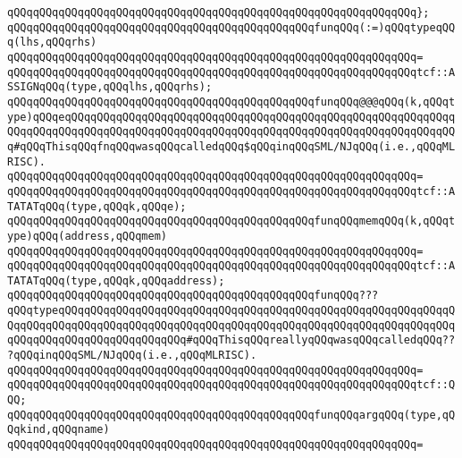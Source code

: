 \verb|qQQqqQQqqQQqqQQqqQQqqQQqqQQqqQQqqQQqqQQqqQQqqQQqqQQqqQQqqQQqqQQq};|\newline
\newline
\verb|qQQqqQQqqQQqqQQqqQQqqQQqqQQqqQQqqQQqqQQqqQQqqQQqfunqQQq(:=)qQQqtypeqQQq(lhs,qQQqrhs)|\newline
\verb|qQQqqQQqqQQqqQQqqQQqqQQqqQQqqQQqqQQqqQQqqQQqqQQqqQQqqQQqqQQqqQQq=|\newline
\verb|qQQqqQQqqQQqqQQqqQQqqQQqqQQqqQQqqQQqqQQqqQQqqQQqqQQqqQQqqQQqqQQqtcf::ASSIGNqQQq(type,qQQqlhs,qQQqrhs);|\newline
\newline
\verb|qQQqqQQqqQQqqQQqqQQqqQQqqQQqqQQqqQQqqQQqqQQqqQQqfunqQQq@@@qQQq(k,qQQqtype)qQQqeqQQqqQQqqQQqqQQqqQQqqQQqqQQqqQQqqQQqqQQqqQQqqQQqqQQqqQQqqQQqqQQqqQQqqQQqqQQqqQQqqQQqqQQqqQQqqQQqqQQqqQQqqQQqqQQqqQQqqQQqqQQqqQQqqQQq#qQQqThisqQQqfnqQQqwasqQQqcalledqQQq$qQQqinqQQqSML/NJqQQq(i.e.,qQQqMLRISC).|\newline
\verb|qQQqqQQqqQQqqQQqqQQqqQQqqQQqqQQqqQQqqQQqqQQqqQQqqQQqqQQqqQQqqQQq=|\newline
\verb|qQQqqQQqqQQqqQQqqQQqqQQqqQQqqQQqqQQqqQQqqQQqqQQqqQQqqQQqqQQqqQQqtcf::ATATATqQQq(type,qQQqk,qQQqe);|\newline
\newline
\verb|qQQqqQQqqQQqqQQqqQQqqQQqqQQqqQQqqQQqqQQqqQQqqQQqfunqQQqmemqQQq(k,qQQqtype)qQQq(address,qQQqmem)|\newline
\verb|qQQqqQQqqQQqqQQqqQQqqQQqqQQqqQQqqQQqqQQqqQQqqQQqqQQqqQQqqQQqqQQq=|\newline
\verb|qQQqqQQqqQQqqQQqqQQqqQQqqQQqqQQqqQQqqQQqqQQqqQQqqQQqqQQqqQQqqQQqtcf::ATATATqQQq(type,qQQqk,qQQqaddress);|\newline
\newline
\verb|qQQqqQQqqQQqqQQqqQQqqQQqqQQqqQQqqQQqqQQqqQQqqQQqfunqQQq???qQQqtypeqQQqqQQqqQQqqQQqqQQqqQQqqQQqqQQqqQQqqQQqqQQqqQQqqQQqqQQqqQQqqQQqqQQqqQQqqQQqqQQqqQQqqQQqqQQqqQQqqQQqqQQqqQQqqQQqqQQqqQQqqQQqqQQqqQQqqQQqqQQqqQQqqQQqqQQqqQQqqQQq#qQQqThisqQQqreallyqQQqwasqQQqcalledqQQq???qQQqinqQQqSML/NJqQQq(i.e.,qQQqMLRISC).|\newline
\verb|qQQqqQQqqQQqqQQqqQQqqQQqqQQqqQQqqQQqqQQqqQQqqQQqqQQqqQQqqQQqqQQq=|\newline
\verb|qQQqqQQqqQQqqQQqqQQqqQQqqQQqqQQqqQQqqQQqqQQqqQQqqQQqqQQqqQQqqQQqtcf::QQQ;|\newline
\newline
\verb|qQQqqQQqqQQqqQQqqQQqqQQqqQQqqQQqqQQqqQQqqQQqqQQqfunqQQqargqQQq(type,qQQqkind,qQQqname)|\newline
\verb|qQQqqQQqqQQqqQQqqQQqqQQqqQQqqQQqqQQqqQQqqQQqqQQqqQQqqQQqqQQqqQQq=|\newline
